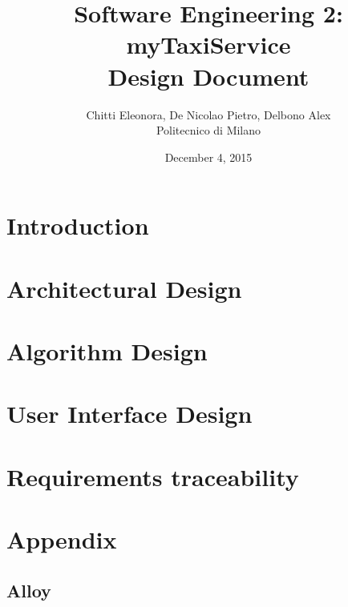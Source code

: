 \documentclass[12pt, a4paper]{report}
\begin{document}
\title{Software Engineering 2: myTaxiService \\ \vspace{1em} Design Document}
\author{Chitti Eleonora, De Nicolao Pietro, Delbono Alex\\
Politecnico di Milano}
\date{December 4, 2015}
\maketitle
\tableofcontents

\chapter{Introduction}






\chapter{Architectural Design}









\chapter{Algorithm Design}

\chapter{User Interface Design}

\chapter{Requirements traceability}

\appendix
\chapter{Appendix}
\section{Alloy}





\end{document}

